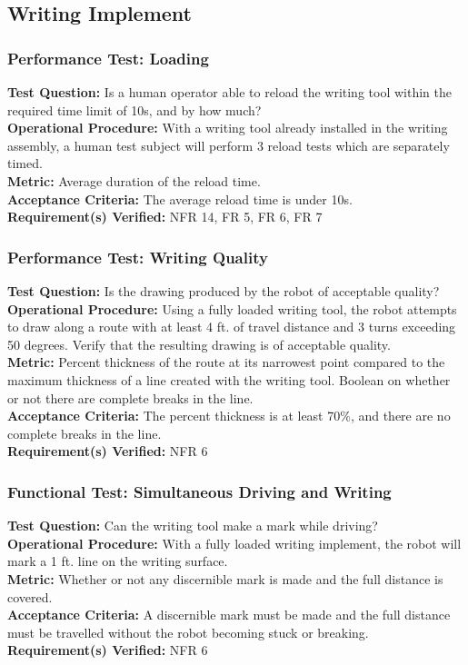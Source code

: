 
\subsection{Writing Implement}
\label{sec:verification_writing_implement}

\subsubsection{Performance Test: Loading}
\label{test:writing_pt_load}
\textbf{Test Question:} Is a human operator able to reload the writing tool within the required time limit of 10s, and by how much? \\
\textbf{Operational Procedure:} With a writing tool already installed in the writing assembly, a human test subject will perform 3 reload tests which are separately timed. \\
\textbf{Metric:} Average duration of the reload time. \\
\textbf{Acceptance Criteria:} The average reload time is under 10s. \\
\textbf{Requirement(s) Verified:} NFR 14, FR 5, FR 6, FR 7

\subsubsection{Performance Test: Writing Quality}
\label{test:writing_pt_qual}
\textbf{Test Question:} Is the drawing produced by the robot of acceptable quality? \\
\textbf{Operational Procedure:} Using a fully loaded writing tool, the robot attempts to draw along a route with at least 4 ft. of travel distance and 3 turns exceeding 50 degrees. Verify that the resulting drawing is of acceptable quality. \\
\textbf{Metric:} Percent thickness of the route at its narrowest point compared to the maximum thickness of a line created with the writing tool. Boolean on whether or not there are complete breaks in the line. \\
\textbf{Acceptance Criteria:} The percent thickness is at least 70\%, and there are no complete breaks in the line. \\
\textbf{Requirement(s) Verified:} NFR 6

\subsubsection{Functional Test: Simultaneous Driving and Writing}
\label{test:writing_ft_both}
\textbf{Test Question:} Can the writing tool make a mark while driving? \\
\textbf{Operational Procedure:} With a fully loaded writing implement, the robot will mark a 1 ft. line on the writing surface.\\
\textbf{Metric:} Whether or not any discernible mark is made and the full distance is covered. \\
\textbf{Acceptance Criteria:} A discernible mark must be made and the full distance must be travelled without the robot becoming stuck or breaking.\\
\textbf{Requirement(s) Verified:} NFR 6


